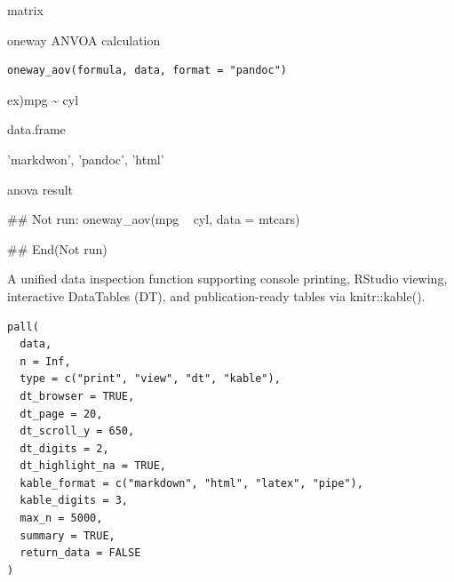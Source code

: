\documentclass[a4paper]{book}
\begin{document}
%
\begin{Value}
matrix
\end{Value}
%
\begin{Description}
oneway ANVOA calculation
\end{Description}
%
\begin{Usage}
\begin{verbatim}
oneway_aov(formula, data, format = "pandoc")
\end{verbatim}
\end{Usage}
%
\begin{Arguments}
\begin{ldescription}
\item[\code{formula}] ex)mpg \textasciitilde{} cyl

\item[\code{data}] data.frame

\item[\code{format}] 'markdwon', 'pandoc', 'html'
\end{ldescription}
\end{Arguments}
%
\begin{Value}
anova result
\end{Value}
%
\begin{Examples}
\begin{ExampleCode}
\#\# Not run: 
oneway_aov(mpg ~ cyl, data = mtcars)

## End(Not run)

\end{ExampleCode}
\end{Examples}
%
\begin{Description}
A unified data inspection function supporting console printing,
RStudio viewing, interactive DataTables (DT), and publication-ready
tables via knitr::kable().
\end{Description}
%
\begin{Usage}
\begin{verbatim}
pall(
  data,
  n = Inf,
  type = c("print", "view", "dt", "kable"),
  dt_browser = TRUE,
  dt_page = 20,
  dt_scroll_y = 650,
  dt_digits = 2,
  dt_highlight_na = TRUE,
  kable_format = c("markdown", "html", "latex", "pipe"),
  kable_digits = 3,
  max_n = 5000,
  summary = TRUE,
  return_data = FALSE
)
\end{verbatim}
\end{Usage}
%
\end{document}
